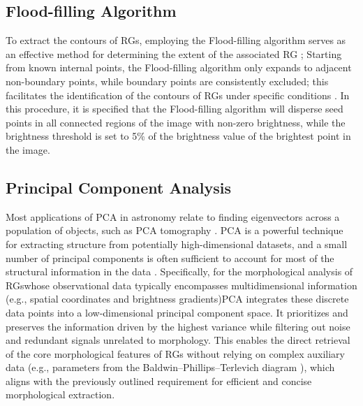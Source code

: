 \documentclass{aa}
\begin{document}
\subsection{Flood-filling Algorithm}\label{sec:Section3_3}
To extract the contours of RGs, employing the Flood-filling algorithm serves as an effective method for determining the extent of the associated RG \citep[e.g.,][]{mingo_revisiting_2019,hales_blobcat_2012}; Starting from known internal points, the Flood-filling algorithm only expands to adjacent non-boundary points, while boundary points are consistently excluded; this facilitates the identification of the contours of RGs under specific conditions \citep{lieberman_how_1978,fishkin_family_1984}. In this procedure, it is specified that the Flood-filling algorithm will disperse seed points in all connected regions of the image with non-zero brightness, while the brightness threshold is set to 5\% of the brightness value of the brightest point in the image.


\subsection{Principal Component Analysis}\label{sec:Section3_4}
Most applications of PCA in astronomy relate to finding eigenvectors across a population of objects, such as PCA tomography \citep[e.g.,][]{steiner_pca_2009}. PCA is a powerful technique for extracting structure from potentially high-dimensional datasets, and a small number of principal components is often sufficient to account for most of the structural information in the data \citep{hofmann_kernel_2008}. Specifically, for the morphological analysis of RGs\textemdash whose observational data typically encompasses multidimensional information (e.g., spatial coordinates and brightness gradients)\textemdash PCA integrates these discrete data points into a low-dimensional principal component space. It prioritizes and preserves the information driven by the highest variance while filtering out noise and redundant signals unrelated to morphology. This enables the direct retrieval of the core morphological features of RGs without relying on complex auxiliary data (e.g., parameters from the Baldwin–Phillips–Terlevich diagram \citep{baldwin_classification_1981}), which aligns with the previously outlined requirement for efficient and concise morphological extraction.
\end{document}
